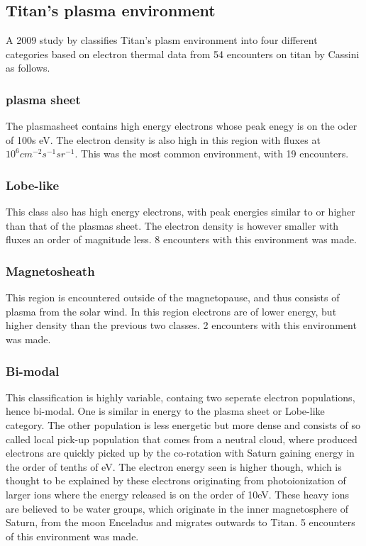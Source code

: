 \documentclass[12pt, parskip=full*, abstract]{scrartcl}
\begin{document}
\subsection{Titan's plasma environment}
A 2009 study by \textcite{Rymer-class} classifies Titan's plasm environment into four different categories based on electron thermal data from 54 encounters on titan by Cassini as follows. 

\subsubsection{plasma sheet}
The plasmasheet contains high energy electrons whose peak enegy is on the oder of 100s eV. The electron density is also high in this region with fluxes at $10^6cm^{-2}s^{-1}sr^{-1}$. This was the most common environment, with 19 encounters. \parencite{Rymer-class}

\subsubsection{Lobe-like}
This class also has high energy electrons, with peak energies similar to or higher than that of the plasmas sheet. The electron density is however smaller with fluxes an order of magnitude less. 8 encounters with this environment was made.\parencite{Rymer-class}

\subsubsection{Magnetosheath}

This region is encountered outside of the magnetopause, and thus consists of plasma from the solar wind. In this region electrons are of lower energy, but higher density than the previous two classes. 2 encounters with this environment was made.\parencite{Rymer-class}

\subsubsection{Bi-modal}
This classification is highly variable, containg two seperate electron populations, hence bi-modal. One is similar in energy to the plasma sheet or Lobe-like category. The other population is less energetic but more dense and consists of so called local pick-up population that comes from a neutral cloud, where produced electrons are quickly picked up by the co-rotation with Saturn gaining energy in the order of tenths of eV. The electron energy seen is higher though, which is thought to be explained by these electrons originating from photoionization of larger ions where the energy released is on the order of 10eV. These heavy ions are believed to be water groups, which originate in the inner magnetosphere of Saturn, from the moon Enceladus and migrates outwards to Titan. 5 encounters of this environment was made.\parencite{Rymer-class}
\end{document}
